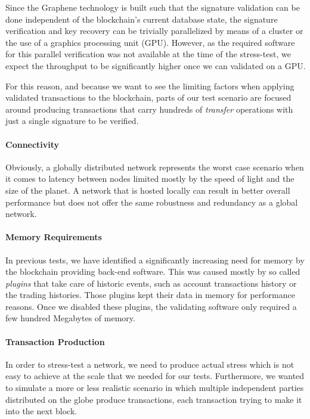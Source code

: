Since the Graphene technology is built such that the signature validation can
be done independent of the blockchain's current database state, the signature
verification and key recovery can be trivially parallelized by means of a
cluster or the use of a graphics processing unit (GPU). However, as the
required software for this parallel verification was not available at the time
of the stress-test, we expect the throughput to be significantly higher once we
can validated on a GPU.

For this reason, and because we want to see the limiting factors when applying
validated transactions to the blockchain, parts of our test scenario are
focused around producing transactions that carry hundreds of \emph{transfer}
operations with just a single signature to be verified.

\paragraph{Connectivity}
Obviously, a globally distributed network represents the worst case scenario
when it comes to latency between nodes limited mostly by the speed of light and
the size of the planet. A network that is hosted locally can result in better
overall performance but does not offer the same robustness and redundancy as a
global network.

\paragraph{Memory Requirements}
In previous tests, we have identified a significantly increasing need for
memory by the blockchain providing back-end software. This was caused mostly by
so called \emph{plugins} that take care of historic events, such as account
transactions history or the trading histories. Those plugins kept their data in
memory for performance reasons. Once we disabled these plugins, the validating
software only required a few hundred Megabytes of memory.

\paragraph{Transaction Production}
In order to stress-test a network, we need to produce actual stress which is not
easy to achieve at the scale that we needed for our tests. Furthermore, we
wanted to simulate a more or less realistic scenario in which multiple
independent parties distributed on the globe produce transactions, each
transaction trying to make it into the next block.

